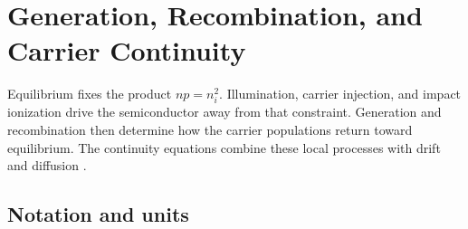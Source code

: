 \chapter{Generation, Recombination, and Carrier Continuity}
\label{ch:generation-recombination-continuity}

Equilibrium fixes the product $np=n_i^2$.  Illumination, carrier injection, and
impact ionization drive the semiconductor away from that constraint.
Generation and recombination then determine how the carrier populations return
toward equilibrium.  The continuity equations combine these local processes
with drift and diffusion \cite[Chap.~2]{szeLee2012}.

\section{Notation and units}

